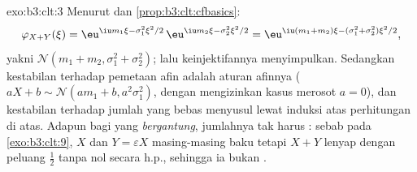 \begin{solution}{exo:b3:clt:3}
Menurut  dan \cref{prop:b3:clt:cfbasics}:
\[
\varphi_{X+Y}(\xi) = \eu^{\iu m_1\xi - \sigma_1^2\xi^2/2}\,
\eu^{\iu m_2\xi - \sigma_2^2\xi^2/2}
= \eu^{\iu(m_1+m_2)\xi - (\sigma_1^2+\sigma_2^2)\xi^2/2},
\]
yakni  $\mathcal N(m_1 + m_2, \sigma_1^2 + \sigma_2^2)$;
lalu keinjektifannya menyimpulkan. Sedangkan kestabilan terhadap pemetaan afin adalah
aturan afinnya ($aX + b \sim \mathcal N(am_1 + b,
a^2\sigma_1^2)$, dengan mengizinkan kasus merosot $a = 0$), dan
kestabilan terhadap jumlah yang bebas menyusul lewat induksi atas
perhitungan di atas. Adapun bagi  yang \emph{bergantung}, jumlahnya
tak harus : sebab pada \cref{exo:b3:clt:9}, $X$ dan $Y =
\varepsilon X$ masing-masing  baku tetapi $X + Y$
lenyap dengan peluang $\frac12$ tanpa nol secara
h.p., sehingga ia bukan .
\end{solution}

